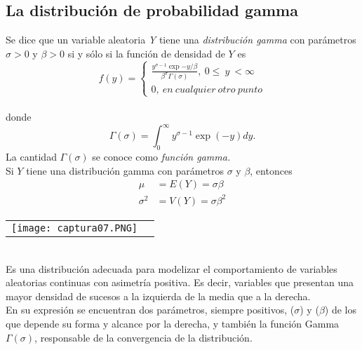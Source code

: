 \documentclass[10pt]{article}\usepackage[]{graphicx}\usepackage[]{color}
\begin{document}
\subsection{La distribución de probabilidad gamma}
Se dice que un variable aleatoria \textit{Y} tiene una \textit{distribución gamma} con parámetros $\sigma>0$ y $\beta>0$ si y sólo si la función de densidad de $Y$ es
\begin{equation*}
f(y)=\left\lbrace\begin{array}{c} \frac{y^{\sigma-1}\exp{-y/\beta}}{\beta^\sigma \Gamma(\sigma)},~0\leq~ y ~<\infty
\\ 0, ~en~ cualquier~ otro ~punto \end{array}\right.
\end{equation*}\\
donde
\begin{equation*}
\Gamma(\sigma)=\int_{0}^{\infty} y^{\sigma-1}\exp{(-y)}dy.
\end{equation*}
La cantidad $\Gamma(\sigma)$ se conoce como \textit{función gamma.}
\\Si $Y$ tiene una distribución gamma con parámetros $\sigma$ y $\beta$, entonces\\
\begin{align*}
\mu&=E(Y)=\sigma\beta\\
\sigma^2&=V(Y)=\sigma\beta^2
\end{align*}
\begin{tabular}{p{} p{} }
\texttt{[image: captura07.PNG]}
\end{tabular}\\
Es una distribución adecuada para modelizar el comportamiento de variables aleatorias continuas con
asimetría positiva. Es decir, variables que presentan una mayor densidad de sucesos a la izquierda de la media que a la derecha.\\ En su expresión se encuentran dos parámetros, siempre positivos, ($\sigma$) y ($\beta$) de los que depende su forma y alcance por la derecha, y también la función Gamma $\Gamma(\sigma)$, responsable de la convergencia de la distribución.
\end{document}
